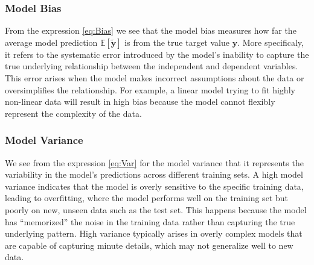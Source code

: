 \documentclass[aps,pra,english,notitlepage,reprint,nofootinbib]{revtex4-1}  %
\begin{document}
\subsubsection{Model Bias}
From the expression \eqref{eq:Bias} we see that the model bias measures how far the average model prediction $\mathbb{E}[\mathbf{\tilde{y}}]$ is from the true target value $\mathbf{y}$. More specificaly, it refers to the systematic error introduced by the model's inability to capture the true underlying relationship between the independent and dependent variables. This error arises when the model makes incorrect assumptions about the data or oversimplifies the relationship. For example, a linear model trying to fit highly non-linear data will result in high bias because the model cannot flexibly represent the complexity of the data.

\subsubsection{Model Variance}
We see from the expression \eqref{eq:Var} for the model variance that it represents the variability in the model's predictions across different training sets. A high model variance indicates that the model is overly sensitive to the specific training data, leading to overfitting, where the model performs well on the training set but poorly on new, unseen data such as the test set. This happens because the model has ``memorized'' the noise in the training data rather than capturing the true underlying pattern. High variance typically arises in overly complex models that are capable of capturing minute details, which may not generalize well to new data.
\end{document}
